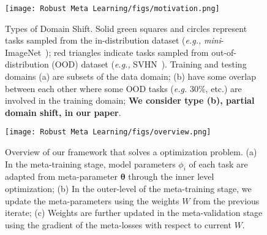 \begin{figure}[!t]
    \centering
    \texttt{[image: Robust Meta Learning/figs/motivation.png]}
    \caption{Types of Domain Shift. Solid green squares and circles represent tasks sampled from the in-distribution dataset (\textit{e.g.,} \textit{mini}-ImageNet~\citep{ravi2016optimization}); red triangles indicate tasks sampled from out-of-distribution (OOD) dataset (\textit{e.g.,} SVHN~\citep{netzer2011reading}). Training and testing domains (a) are subsets of the data domain; (b) have some overlap between each other where some OOD tasks (\textit{e.g.} $30\%$, etc.) are involved in the training domain; \textbf{We consider type (b), partial domain shift, in our paper}.}
    \label{fig:motivation}
\vspace{-5mm}
\end{figure}

\begin{figure*}[!htbp]
    \centering
    \texttt{[image: Robust Meta Learning/figs/overview.png]}
    \caption{Overview of our \sysname{} framework that solves a \biopt{} optimization problem. (a) In the meta-training stage, model parameters $\phi_i$ of each task are adapted from meta-parameter $\boldsymbol{\theta}$ through the inner level optimization; (b) In the outer-level of the meta-training stage, we update the meta-parameters using the weights $W$ from the previous iterate; (c) Weights are further updated in the meta-validation stage using the gradient of the meta-losses with respect to current $W$.} 
    \label{fig:overview}
    \vspace{-5mm}
\end{figure*}


